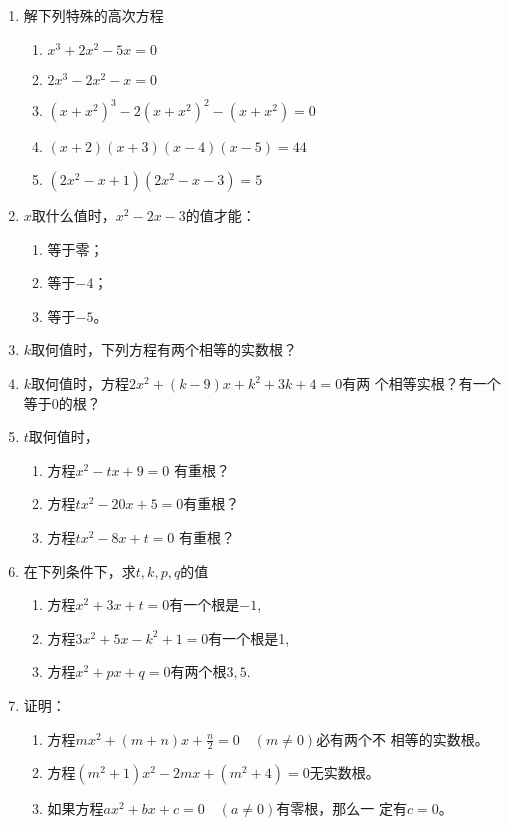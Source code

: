 \begin{enumerate}
\item 解下列特殊的高次方程
\begin{enumerate}
    \item $x^{3}+2 x^{2}-5 x=0$
    \item  $2 x^{3}-2 x^{2}-x=0$
    \item $\left(x+x^{2}\right)^{3}-2\left(x+x^{2}\right)^{2}-\left(x+x^{2}\right)=0$
    \item $(x+2)(x+3)(x-4)(x-5)=44$
    \item $(2x^2-x+1)(2x^2-x-3)=5$
\end{enumerate}

\item $x$取什么值时，$x^2-2x-3$的值才能：
\begin{multicols}{3}
\begin{enumerate}
    \item 等于零；
    \item 等于$-4$；
    \item 等于$-5$。
\end{enumerate}
\end{multicols}

\item $k$取何值时，下列方程有两个相等的实数根？
\begin{enumerate}
\end{enumerate}

\item $k$取何值时，方程$2x^2+(k-9)x+k^2+3k+4=0$有两
个相等实根？有一个等于0的根？
\item $t$取何值时，
\begin{enumerate}
    \item 方程$x^2-tx+9=0$ 有重根？
    \item 方程$tx^2-20x+5=0$有重根？
    \item 方程$tx^2-8x+t=0$ 有重根？
\end{enumerate}

\item 在下列条件下，求$t,k,p,q$的值
\begin{enumerate}
    \item 方程$x^2+3x+t=0$有一个根是$-1$,
    \item 方程$3x^2+5x-k^2+1=0$有一个根是1,
    \item 方程$ x^2+px+q=0$有两个根$3,5$.
\end{enumerate}
\item 证明：
\begin{enumerate}
    \item 方程$mx^2+(m+n)x+\frac{n}{2}=0\quad (m\ne 0)$必有两个不
相等的实数根。
\item 方程$(m^2+1)x^2-2mx+(m^2+4)=0$无实数根。
\item 如果方程$ax^2+bx+c=0\quad (a\ne 0)$有零根，那么一
定有$c=0$。
\end{enumerate}



\end{enumerate}
